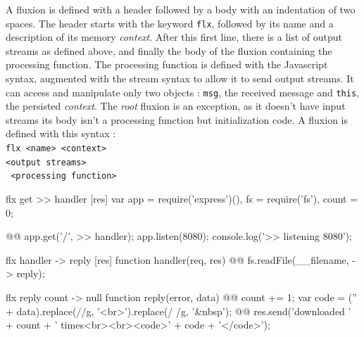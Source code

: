 A fluxion is defined with a header followed by a body with an indentation of two spaces.
The header starts with the keyword \texttt{flx}, followed by its name and a description of its memory \textit{context}.
After this first line, there is a list of output streams as defined above, and finally the body of the fluxion containing the processing function.
The processing function is defined with the Javascript syntax, augmented with the stream syntax to allow it to send output streams.
It can access and manipulate only two objects : \texttt{msg}, the received message and \texttt{this}, the persisted \textit{context}.
The \textit{root} fluxion is an exception, as it doesn't have input streams its body isn't a processing function but initialization code.
A fluxion is defined with this syntax :\\
\texttt{flx <name> {<context>}}\\
\texttt{<output streams>}\\
\texttt{  <processing function>}\\


\begin{code}[flx, caption={Manual transformation of the example application in our high-level fluxional language},label={lst:fluxional}]
flx get
>> handler [res]
  var app = require('express')(),
      fs = require('fs'),
      count = 0;

@\label{lst:fluxional-streamtohandler}@  app.get('/', >> handler);
  app.listen(8080);
  console.log('>> listening 8080');

flx handler
-> reply [res]
  function handler(req, res) {
@\label{lst:fluxional-readfile}@      fs.readFile(__filename, -> reply);
  }

flx reply {count}
-> null
  function reply(error, data) {
@\label{lst:fluxional-counter}@    count += 1;
    var code = ('' + data).replace(/\n/g, '<br>').replace(/ /g, '&nbsp');
@\label{lst:fluxional-ressend}@    res.send('downloaded ' + count + ' times<br><br><code>' + code + '</code>');
  }
\end{code}

